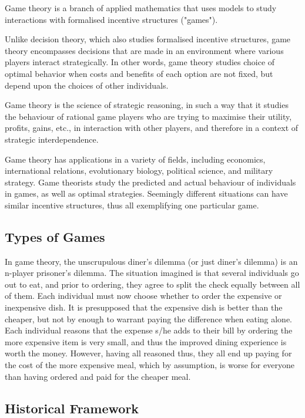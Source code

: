 \documentclass[]{report}
\begin{document}
Game theory is a branch of applied mathematics that uses models to study interactions with formalised incentive structures ("games"). 

Unlike decision theory, which also studies formalised incentive structures, game theory encompasses decisions that are made in an environment where various players interact strategically. In other words, game theory studies choice of optimal behavior when costs and benefits of each option are not fixed, but depend upon the choices of other individuals.



Game theory is the science of strategic reasoning, in such a way that it studies the behaviour of rational game players who are trying to maximise their utility, profits, gains, etc., in interaction with other players, and therefore in a context of strategic interdependence.

Game theory has applications in a variety of fields, including economics,  international relations, evolutionary biology, political science, and  military strategy. Game theorists study the predicted and actual  behaviour of individuals in games, as well as optimal strategies.  Seemingly different situations can have similar incentive  structures, thus all exemplifying one particular game. 


\subsection{Types of Games}

In game theory, the unscrupulous diner's dilemma (or just diner's dilemma) is an n-player prisoner's dilemma. The situation imagined is that several individuals go out to eat, and prior to ordering, they agree to split the check equally between all of them. Each individual must now choose whether to order the expensive or inexpensive dish. It is presupposed that the expensive dish is better than the cheaper, but not by enough to warrant paying the difference when eating alone. Each individual reasons that the expense s/he adds to their bill by ordering the more expensive item is very small, and thus the improved dining experience is worth the money. However, having all reasoned thus, they all end up paying for the cost of the more expensive meal, which by assumption, is worse for everyone than having ordered and paid for the cheaper meal.

\subsection{Historical Framework}
\end{document}
